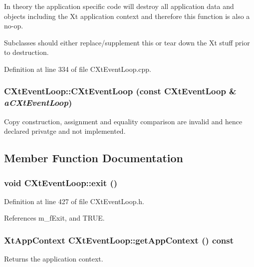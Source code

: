 In theory the application specific code will destroy all application data and objects including the Xt application context and therefore this function is also a no-op.

Subclasses should either replace/supplement this or tear down the Xt stuff prior to destruction. 

Definition at line 334 of file CXt\-Event\-Loop.cpp.
\subsubsection{\setlength{\rightskip}{0pt plus 5cm}CXt\-Event\-Loop::CXt\-Event\-Loop (const CXt\-Event\-Loop \& {\em a\-CXt\-Event\-Loop})\hspace{0.3cm}{\tt  [private]}}\label{classCXtEventLoop_c1}


Copy construction, assignment and equality comparison are invalid and hence declared privatge and not implemented. 

\subsection{Member Function Documentation}
\subsubsection{\setlength{\rightskip}{0pt plus 5cm}void CXt\-Event\-Loop::exit ()\hspace{0.3cm}{\tt  [inline]}}\label{classCXtEventLoop_a8}




Definition at line 427 of file CXt\-Event\-Loop.h.

References m\_\-f\-Exit, and TRUE.
\subsubsection{\setlength{\rightskip}{0pt plus 5cm}Xt\-App\-Context CXt\-Event\-Loop::get\-App\-Context () const\hspace{0.3cm}{\tt  [inline]}}\label{classCXtEventLoop_a3}


Returns the application context.



